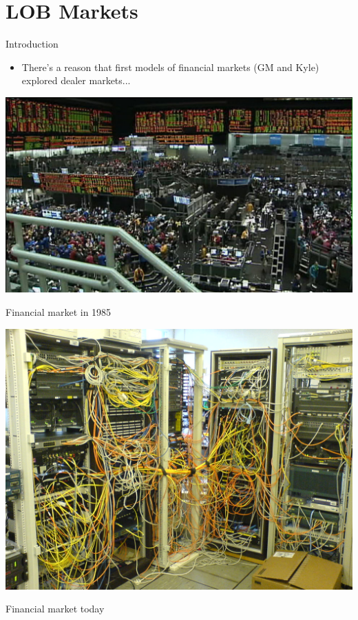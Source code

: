 \documentclass[english,10pt]{beamer}
\begin{document}
\section{LOB Markets}

\begin{frame}{Introduction}
	\begin{itemize}
		\item There's a reason that first models of financial markets (GM and Kyle) explored dealer markets...
	\end{itemize}
\end{frame}


\begin{frame}
	\centering
	\includegraphics[scale=0.5]{pics/mkt20}
	
	Financial market in 1985
\end{frame}


\begin{frame}
	\centering
	\includegraphics[scale=0.19]{pics/mkt21}
	
	Financial market today
\end{frame}
\end{document}
